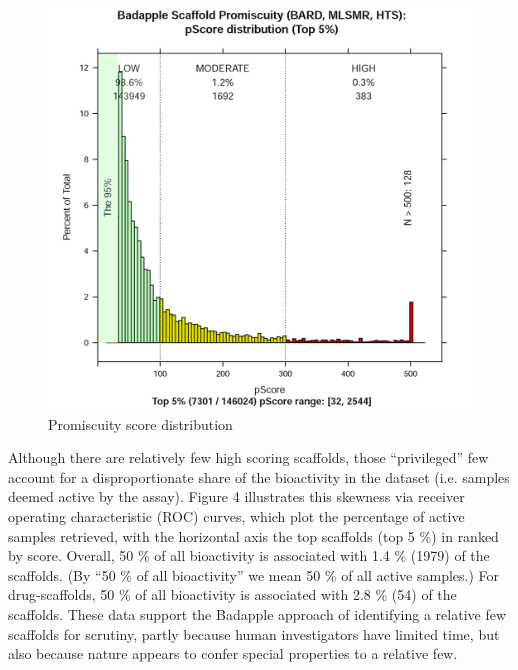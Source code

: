 \begin{figure}
	\includegraphics[width=\textwidth]{figures/badapple/Badapple_Fig3.png}
	\caption{Promiscuity score distribution}
	\label{fig:BA_03}
\end{figure}

Although there are relatively few high scoring scaffolds, those “privileged” few account for a disproportionate share of the bioactivity in the dataset (i.e. samples deemed active by the assay). Figure 4 illustrates this skewness via receiver operating characteristic (ROC) curves, which plot the percentage of active samples retrieved, with the horizontal axis the top scaffolds (top 5 \%) in ranked by score. Overall, 50 \% of all bioactivity is associated with 1.4 \% (1979) of the scaffolds. (By “50 \% of all bioactivity” we mean 50 \% of all active samples.) For drug-scaffolds, 50 \% of all bioactivity is associated with 2.8 \% (54) of the scaffolds. These data support the Badapple approach of identifying a relative few scaffolds for scrutiny, partly because human investigators have limited time, but also because nature appears to confer special properties to a relative few.

